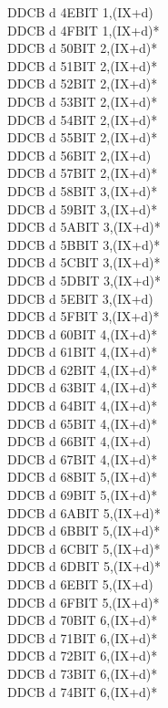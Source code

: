 \documentclass[oneside,a4paper]{book}
\begin{document}
\begin{multicols}{3}
{\begin{tabbing}
DDCB d 4E\>BIT 1,(IX+d)\\
DDCB d 4F\>BIT 1,(IX+d)*\\
DDCB d 50\>BIT 2,(IX+d)*\\
DDCB d 51\>BIT 2,(IX+d)*\\
DDCB d 52\>BIT 2,(IX+d)*\\
DDCB d 53\>BIT 2,(IX+d)*\\
DDCB d 54\>BIT 2,(IX+d)*\\
DDCB d 55\>BIT 2,(IX+d)*\\
DDCB d 56\>BIT 2,(IX+d)\\
DDCB d 57\>BIT 2,(IX+d)*\\
DDCB d 58\>BIT 3,(IX+d)*\\
DDCB d 59\>BIT 3,(IX+d)*\\
DDCB d 5A\>BIT 3,(IX+d)*\\
DDCB d 5B\>BIT 3,(IX+d)*\\
DDCB d 5C\>BIT 3,(IX+d)*\\
DDCB d 5D\>BIT 3,(IX+d)*\\
DDCB d 5E\>BIT 3,(IX+d)\\
DDCB d 5F\>BIT 3,(IX+d)*\\
DDCB d 60\>BIT 4,(IX+d)*\\
DDCB d 61\>BIT 4,(IX+d)*\\
DDCB d 62\>BIT 4,(IX+d)*\\
DDCB d 63\>BIT 4,(IX+d)*\\
DDCB d 64\>BIT 4,(IX+d)*\\
DDCB d 65\>BIT 4,(IX+d)*\\
DDCB d 66\>BIT 4,(IX+d)\\
DDCB d 67\>BIT 4,(IX+d)*\\
DDCB d 68\>BIT 5,(IX+d)*\\
DDCB d 69\>BIT 5,(IX+d)*\\
DDCB d 6A\>BIT 5,(IX+d)*\\
DDCB d 6B\>BIT 5,(IX+d)*\\
DDCB d 6C\>BIT 5,(IX+d)*\\
DDCB d 6D\>BIT 5,(IX+d)*\\
DDCB d 6E\>BIT 5,(IX+d)\\
DDCB d 6F\>BIT 5,(IX+d)*\\
DDCB d 70\>BIT 6,(IX+d)*\\
DDCB d 71\>BIT 6,(IX+d)*\\
DDCB d 72\>BIT 6,(IX+d)*\\
DDCB d 73\>BIT 6,(IX+d)*\\
DDCB d 74\>BIT 6,(IX+d)*\\

\end{tabbing}}
\end{multicols}
\end{document}
